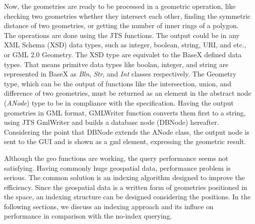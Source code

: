 \documentclass[a4paper,12pt]{article}
\begin{document}
Now, the geometries are ready to be processed in a geometric operation, like checking two geometries whether they intersect each other, finding the symmetric distance of two geometries, or getting the number of inner rings of a polygon. The operations are done using the JTS functions. The output could be in any XML Schema (XSD) data types, such as integer, boolean, string, URI, and etc., or GML 2.0 Geometry. The XSD type are equivalet to the BaseX defined data types. That means primitve data types like boolan, integer, and string are represented in BaseX as \textit{Bln}, \textit{Str}, and \textit{Int} classes respectively. The Geometry type, which can be the output of functions like the intersection, union, and difference of two geometries, must be returned as an element in the abstract node (\textit{ANode}) type to be in compliance with the specification. Having the output geometries in GML format, GMLWriter function converts them first to a string, using JTS GmlWriter and builds a database node (DBNode) hereafter. Considering the point that DBNode extends the ANode class, the output node is sent to the GUI and is shown as a gml element, expressing the geometric result. 

Although the geo functions are working, the query performance seems not satisfying. Having commonly huge geospatial data, performance problem is serious. The common solution is an indexing algorithm designed to improve the efficiency. Since the geospatial data is a written form of geometries positioned in the space, an indexing structure can be designed considering the positions. In the following sections, we discuss an indexing approach and its influce on performance in comparison with the no-index querying.
\end{document}
